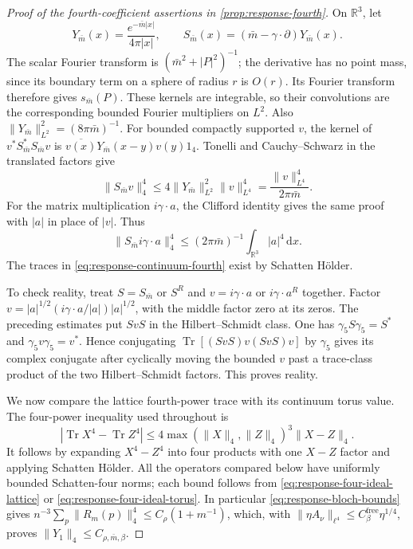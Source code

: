 \documentclass[11pt,letterpaper,reqno]{amsart}
\newcommand{\R}{\mathbb R}
\newcommand{\dd}{\mathrm d}
\begin{document}
\begin{proof}[Proof of the fourth-coefficient assertions in \cref{prop:response-fourth}]
On $\R^3$, let
\[
 Y_{\bar m}(x)=\frac{e^{-\bar m|x|}}{4\pi|x|},\qquad
 S_{\bar m}(x)=(\bar m-\gamma\cdot\partial)Y_{\bar m}(x).
\]
The scalar Fourier transform is $(\bar m^2+|P|^2)^{-1}$;
the derivative has no point mass, since its boundary
term on a sphere of radius $r$ is $O(r)$. Its Fourier
transform therefore gives $s_{\bar m}(P)$. These kernels
are integrable, so their convolutions are the corresponding
bounded Fourier multipliers on $L^2$. Also
$\|Y_{\bar m}\|_{L^2}^2=(8\pi\bar m)^{-1}$.
For bounded compactly supported $v$, the kernel of
$v^*S_{\bar m}^*S_{\bar m}v$ is
$\overline{v(x)}Y_{\bar m}(x-y)v(y)1_4$. Tonelli and
Cauchy--Schwarz in the translated factors give
\[
 \|S_{\bar m}v\|_4^4
   \le4\|Y_{\bar m}\|_{L^2}^2\|v\|_{L^4}^4
   =\frac{\|v\|_{L^4}^4}{2\pi\bar m}.
\]
For the matrix multiplication $i\gamma\cdot a$, the
Clifford identity gives the same proof with $|a|$ in
place of $|v|$. Thus
\begin{equation}\label{eq:response-four-ideal-infinite}
 \|S_{\bar m}i\gamma\cdot a\|_4^4\le
                    (2\pi\bar m)^{-1}\int_{\R^3}|a|^4\,\dd x.
\end{equation}
The traces in
\eqref{eq:response-continuum-fourth} exist by Schatten
H\"older.

To check reality, treat $S=S_{\bar m}$ or $S^R$ and
$v=i\gamma\cdot a$ or $i\gamma\cdot a^R$ together.
Factor $v=|a|^{1/2}(i\gamma\cdot a/|a|)|a|^{1/2}$,
with the middle factor zero at its zeros. The preceding
estimates put $SvS$ in the Hilbert--Schmidt class.
One has $\gamma_5S\gamma_5=S^*$ and
$\gamma_5v\gamma_5=v^*$. Hence conjugating
$\operatorname{Tr}[(SvS)v(SvS)v]$ by $\gamma_5$ gives
its complex conjugate after cyclically moving the
bounded $v$ past a trace-class product of the two
Hilbert--Schmidt factors. This proves reality.

We now compare the lattice fourth-power trace with its
continuum torus value. The four-power inequality used
throughout is
\begin{equation}\label{eq:response-fourth-trace-difference}
 |\operatorname{Tr}X^4-\operatorname{Tr}Z^4|
 \le4\max(\|X\|_4,\|Z\|_4)^3\|X-Z\|_4.
\end{equation}
It follows by expanding $X^4-Z^4$ into four products
with one $X-Z$ factor and applying Schatten H\"older.
All the operators compared below have uniformly bounded
Schatten-four norms; each bound follows from
\eqref{eq:response-four-ideal-lattice} or
\eqref{eq:response-four-ideal-torus}. In particular
\eqref{eq:response-bloch-bounds} gives
$n^{-3}\sum_p\|R_m(p)\|_4^4\le
C_\rho(1+m^{-1})$, which, with
$\|\eta A_\nu\|_{\ell^4}\le C_\beta^{\mathrm{free}}\eta^{1/4}$,
proves $\|Y_1\|_4\le C_{\rho,\bar m,\beta}$.


\end{proof}
\end{document}
